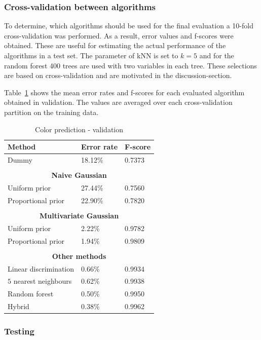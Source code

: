 \documentclass[twoside]{article}
\begin{document}
\begin{multicols}{2}
\subsubsection{Cross-validation between algorithms}

To determine, which algorithms should be used for the final evaluation a 10-fold cross-validation was performed. As a result, error values and f-scores were obtained.
These are useful for estimating the actual performance of the algorithms in a test set. The parameter of 
kNN is set to $k = 5$ and for the random forest 400 trees are used with two variables in each tree. These
selections are based on cross-validation and are motivated in the discussion-section.

Table~\ref{table:color_validation} shows the mean error rates and f-scores for each evaluated algorithm obtained in validation. The values are averaged over each
cross-validation partition on the training data.

\begin{table}[H]
\caption{Color prediction - validation}
\label{table:color_validation}
\begin{tabular}{lll}
\textbf{Method} & \textbf{Error rate} & \textbf{F-score}\\
\midrule
Dummy & 18.12\% & 0.7373 \\
\\
\multicolumn{3}{c}{\textbf{Naive Gaussian}} \\
Uniform prior & 27.44\% & 0.7560 \\
Proportional prior & 22.90\% & 0.7820 \\
\\
\multicolumn{3}{c}{\textbf{Multivariate Gaussian}} \\
Uniform prior & 2.22\% & 0.9782 \\
Proportional prior & 1.94\% & 0.9809 \\
\\
\multicolumn{3}{c}{\textbf{Other methods}} \\
Linear discrimination & 0.66\% & 0.9934 \\
$5$ nearest neighbours & 0.62\% & 0.9938 \\
Random forest & 0.50\% & 0.9950 \\
Hybrid & 0.38\% & 0.9962 \\

\end{tabular}
\end{table}

\subsubsection{Testing}


\end{multicols}
\end{document}
